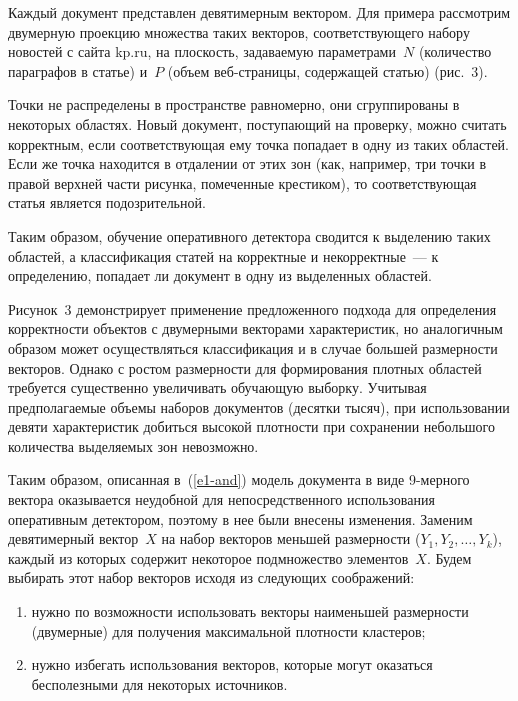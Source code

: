 \begin{multicols}{2}
 
    Каждый документ представлен девятимерным вектором. Для примера 
рассмотрим двумерную проекцию множества таких векторов, 
соответствующего набору новостей с сайта {\sf kp.ru}, на плоскость, задаваемую 
параметрами~$N$ (количество параграфов в статье) и~$P$ (объем 
  веб-стра\-ни\-цы, содержащей статью) (рис.~3).
  

  
    Точки не распределены в пространстве равномерно, они сгруппированы в 
некоторых областях. Новый документ, поступающий на проверку, можно 
считать корректным, если соответствующая ему точка попадает в одну из таких 
областей. Если же точка находится в отдалении от этих зон (как, например, три 
точки в правой верхней части рисунка, помеченные крестиком), то 
соответствующая статья является подозрительной.
  
    Таким образом, обучение оперативного детектора сводится к выделению 
таких областей, а классификация статей на корректные и некорректные~--- к 
определению, попадает ли документ в одну из выделенных областей.
  
     Рисунок~3 демонстрирует применение предложенного подхода для 
определения корректности объектов с двумерными векторами характеристик, 
но аналогичным образом может осуществляться классификация и в случае 
большей размерности векторов. Однако с ростом размерности для 
формирования плотных областей требуется существенно увеличивать 
обучающую выборку. Учитывая предполагаемые объемы наборов документов 
(десятки тысяч), при использовании девяти характеристик добиться высокой 
плотности при сохранении небольшого количества выделяемых зон 
невозможно.
  
    Таким образом, описанная в~(\ref{e1-and}) модель документа в виде 
  9-мер\-но\-го вектора оказывается неудобной для непосредственного 
использования оперативным детектором, поэтому в нее были внесены 
изменения. Заменим девятимерный вектор~$X$ на набор векторов меньшей 
размерности ($Y_1, Y_2, \ldots , Y_k$), каждый из которых содержит некоторое 
подмножество элементов~$X$. Будем выбирать этот набор векторов исходя из 
следующих соображений:
  \begin{enumerate}[(1)]
\item нужно по возможности использовать векторы наименьшей 
размерности (двумерные) для получения максимальной плотности 
кластеров;
\item нужно избегать использования векторов, которые могут оказаться 
бесполезными для некоторых источников.
\end{enumerate}


\end{multicols}
